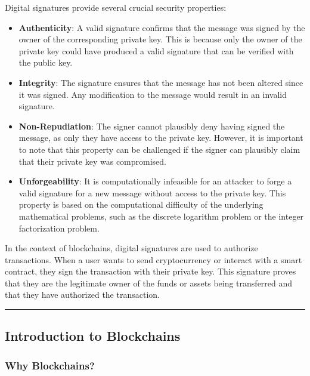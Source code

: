 Digital signatures provide several crucial security properties:

\begin{itemize}
	\tightlist
	\item
	\textbf{Authenticity}: A valid signature confirms that the message was
	signed by the owner of the corresponding private key. This is because
	only the owner of the private key could have produced a valid
	signature that can be verified with the public key.
	\item
	\textbf{Integrity}: The signature ensures that the message has not
	been altered since it was signed. Any modification to the message
	would result in an invalid signature.
	\item
	\textbf{Non-Repudiation}: The signer cannot plausibly deny having
	signed the message, as only they have access to the private key.
	However, it is important to note that this property can be challenged
	if the signer can plausibly claim that their private key was
	compromised.
	\item
	\textbf{Unforgeability}: It is computationally infeasible for an
	attacker to forge a valid signature for a new message without access
	to the private key. This property is based on the computational
	difficulty of the underlying mathematical problems, such as the
	discrete logarithm problem or the integer factorization problem.
\end{itemize}

In the context of blockchains, digital signatures are used to authorize
transactions. When a user wants to send cryptocurrency or interact with
a smart contract, they sign the transaction with their private key. This
signature proves that they are the legitimate owner of the funds or
assets being transferred and that they have authorized the transaction.

\begin{center}\rule{0.5\linewidth}{0.5pt}\end{center}

\subsection{Introduction to
	Blockchains}\label{section-3-introduction-to-blockchains}

\subsubsection{Why Blockchains?}\label{why-blockchains}

